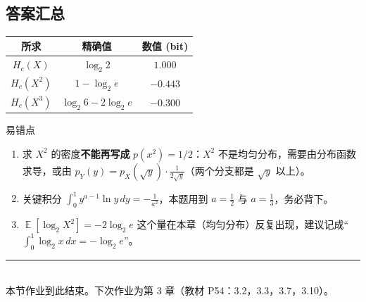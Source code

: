 \documentclass[11pt,a4paper]{ctexart}
\newcommand{\Hc}[1]{H_{c}\!\left(#1\right)}
\newcommand{\lb}{\log_{2}}
\DeclareMathOperator{\E}{\mathbb{E}}
\begin{document}
\subsection*{答案汇总}
\begin{center}
\renewcommand{\arraystretch}{1.3}
\begin{tabular}{c|c|c}
\toprule
所求 & 精确值 & 数值 (bit)\\
\midrule
$\Hc{X}$ & $\lb 2$ & $1.000$\\
$\Hc{X^2}$ & $1-\lb e$ & $-0.443$\\
$\Hc{X^3}$ & $\lb 6-2\lb e$ & $-0.300$\\
\bottomrule
\end{tabular}
\end{center}

\begin{keypoint}{易错点}
\begin{enumerate}[leftmargin=1.6em,itemsep=1pt,topsep=2pt]
  \item 求 $X^2$ 的密度\textbf{不能再写成} $p(x^2)=1/2$：$X^2$ 不是均匀分布，需要由分布函数求导，或由 $p_Y(y)=p_X(\sqrt y)\cdot\frac{1}{2\sqrt y}$（两个分支都是 $\sqrt y$ 以上）。
  \item 关键积分 $\displaystyle\int_0^1 y^{a-1}\ln y\,dy=-\frac{1}{a^2}$，本题用到 $a=\tfrac12$ 与 $a=\tfrac13$，务必背下。
  \item $\E[\lb X^2]=-2\lb e$ 这个量在本章（均匀分布）反复出现，建议记成“$\displaystyle\int_0^1\lb x\,dx=-\lb e$”。
\end{enumerate}
\end{keypoint}

\vspace{6pt}
\begin{center}
\rule{0.9\textwidth}{0.4pt}\\[2pt]
{\small 本节作业到此结束。下次作业为第 3 章（教材 P54：3.2，3.3，3.7，3.10）。}
\end{center}
\end{document}
